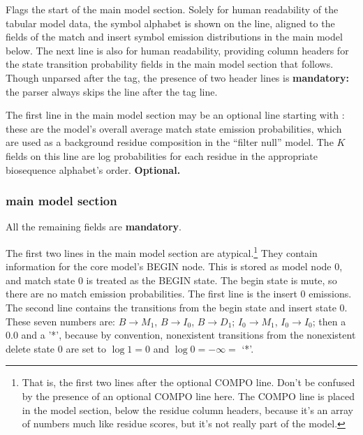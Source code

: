 \begin{sreitems}{}
\item [\emprog{HMM }] Flags the start of the main model
section. Solely for human readability of the tabular model data, the
symbol alphabet is shown on the  line, aligned to the fields
of the match and insert symbol emission distributions in the main
model below. The next line is also for human readability, providing
column headers for the state transition probability fields in the main
model section that follows. Though unparsed after the  tag,
the presence of two header lines is \textbf{mandatory:} the parser
always skips the line after the  tag line.

\item [\emprog{COMPO <f>*K}] The first line in the main model section
may be an optional line starting with : these are the
model's overall average match state emission probabilities, which are
used as a background residue composition in the ``filter null''
model. The $K$ fields on this line are log probabilities for each
residue in the appropriate biosequence alphabet's
order. \textbf{Optional.}

\end{sreitems}

\subsubsection{main model section}

All the remaining fields are \textbf{mandatory}.

The first two lines in the main model section are
atypical.\footnote{That is, the first two lines after the optional
  COMPO line. Don't be confused by the presence of an optional COMPO
  line here. The COMPO line is placed in the model section, below the
  residue column headers, because it's an array of numbers much like
  residue scores, but it's not really part of the model.}  They
contain information for the core model's BEGIN node. This is stored as
model node 0, and match state 0 is treated as the BEGIN state.  The
begin state is mute, so there are no match emission probabilities. The
first line is the insert 0 emissions. The second line contains the
transitions from the begin state and insert state 0.  These seven
numbers are: $B \rightarrow M_1$, $B \rightarrow I_0$, $B \rightarrow
D_1$; $I_0 \rightarrow M_1$, $I_0 \rightarrow I_0$; then a 0.0 and a
'*', because by convention, nonexistent transitions from the
nonexistent delete state 0 are set to $\log 1 = 0$ and $\log 0 =
-\infty = $ `*'.

